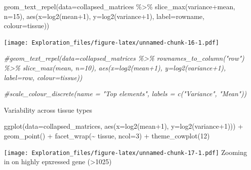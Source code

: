 \documentclass[
]{article}
\newenvironment{Shaded}{\begin{snugshade}}{\end{snugshade}}
\newcommand{\AttributeTok}[1]{\textcolor[rgb]{0.77,0.63,0.00}{#1}}
\newcommand{\CommentTok}[1]{\textcolor[rgb]{0.56,0.35,0.01}{\textit{#1}}}
\newcommand{\DecValTok}[1]{\textcolor[rgb]{0.00,0.00,0.81}{#1}}
\newcommand{\FunctionTok}[1]{\textcolor[rgb]{0.00,0.00,0.00}{#1}}
\newcommand{\NormalTok}[1]{#1}
\newcommand{\SpecialCharTok}[1]{\textcolor[rgb]{0.00,0.00,0.00}{#1}}
\begin{document}
\begin{Shaded}
\begin{Highlighting}[]
  \FunctionTok{geom\_text\_repel}\NormalTok{(}\AttributeTok{data=}\NormalTok{collapsed\_matrices }\SpecialCharTok{\%\textgreater{}\%} \FunctionTok{slice\_max}\NormalTok{(variance}\SpecialCharTok{+}\NormalTok{mean, }\AttributeTok{n=}\DecValTok{15}\NormalTok{), }\FunctionTok{aes}\NormalTok{(}\AttributeTok{x=}\FunctionTok{log2}\NormalTok{(mean}\SpecialCharTok{+}\DecValTok{1}\NormalTok{), }\AttributeTok{y=}\FunctionTok{log2}\NormalTok{(variance}\SpecialCharTok{+}\DecValTok{1}\NormalTok{), }\AttributeTok{label=}\NormalTok{rowname, }\AttributeTok{colour=}\NormalTok{tissue)) }
\end{Highlighting}
\end{Shaded}

\texttt{[image: Exploration\_files/figure-latex/unnamed-chunk-16-1.pdf]}

\begin{Shaded}
\begin{Highlighting}[]
  \CommentTok{\#geom\_text\_repel(data=collapsed\_matrices \%\textgreater{}\% rownames\_to\_column("row") \%\textgreater{}\% slice\_max(mean, n=10), aes(x=log2(mean+1), y=log2(variance+1), label=row, colour=tissue))}
  
  \CommentTok{\#scale\_colour\_discrete(name = "Top elements", labels = c("Variance", "Mean"))}
\end{Highlighting}
\end{Shaded}

Variability across tissue types

\begin{Shaded}
\begin{Highlighting}[]
\FunctionTok{ggplot}\NormalTok{(}\AttributeTok{data=}\NormalTok{collapsed\_matrices, }\FunctionTok{aes}\NormalTok{(}\AttributeTok{x=}\FunctionTok{log2}\NormalTok{(mean}\SpecialCharTok{+}\DecValTok{1}\NormalTok{), }\AttributeTok{y=}\FunctionTok{log2}\NormalTok{(variance}\SpecialCharTok{+}\DecValTok{1}\NormalTok{))) }\SpecialCharTok{+} \FunctionTok{geom\_point}\NormalTok{() }\SpecialCharTok{+}  \FunctionTok{facet\_wrap}\NormalTok{(}\SpecialCharTok{\textasciitilde{}}\NormalTok{ tissue, }\AttributeTok{ncol=}\DecValTok{3}\NormalTok{) }\SpecialCharTok{+} \FunctionTok{theme\_cowplot}\NormalTok{(}\DecValTok{12}\NormalTok{) }
\end{Highlighting}
\end{Shaded}

\texttt{[image: Exploration\_files/figure-latex/unnamed-chunk-17-1.pdf]}
Zooming in on highly epxressed gene (\textgreater1025)
\end{document}
